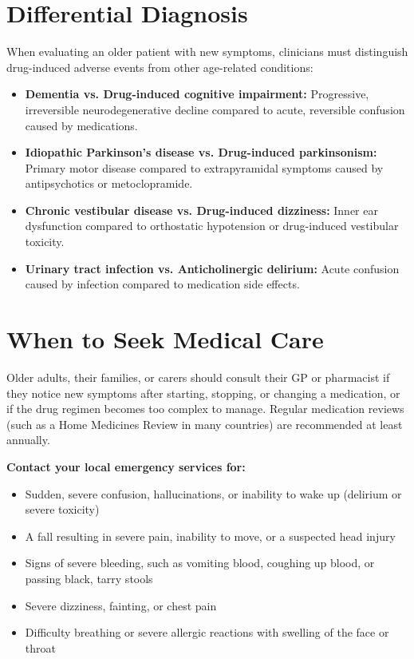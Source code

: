 \section*{Differential Diagnosis}
When evaluating an older patient with new symptoms, clinicians must distinguish drug-induced adverse events from other age-related conditions:

\begin{itemize}
    \item \textbf{Dementia vs. Drug-induced cognitive impairment:} Progressive, irreversible neurodegenerative decline compared to acute, reversible confusion caused by medications.
    \item \textbf{Idiopathic Parkinson's disease vs. Drug-induced parkinsonism:} Primary motor disease compared to extrapyramidal symptoms caused by antipsychotics or metoclopramide.
    \item \textbf{Chronic vestibular disease vs. Drug-induced dizziness:} Inner ear dysfunction compared to orthostatic hypotension or drug-induced vestibular toxicity.
    \item \textbf{Urinary tract infection vs. Anticholinergic delirium:} Acute confusion caused by infection compared to medication side effects.
\end{itemize}

\section*{When to Seek Medical Care}
Older adults, their families, or carers should consult their GP or pharmacist if they notice new symptoms after starting, stopping, or changing a medication, or if the drug regimen becomes too complex to manage. Regular medication reviews (such as a Home Medicines Review in many countries) are recommended at least annually.

\textbf{Contact your local emergency services for:}
\begin{itemize}
    \item Sudden, severe confusion, hallucinations, or inability to wake up (delirium or severe toxicity)
    \item A fall resulting in severe pain, inability to move, or a suspected head injury
    \item Signs of severe bleeding, such as vomiting blood, coughing up blood, or passing black, tarry stools
    \item Severe dizziness, fainting, or chest pain
    \item Difficulty breathing or severe allergic reactions with swelling of the face or throat
\end{itemize}

